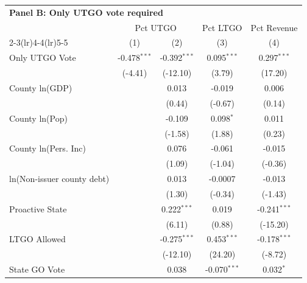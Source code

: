 \begingroup
\centering
\begin{tabular*}{\textwidth}{@{\extracolsep{\fill}}lcccc}
\multicolumn{5}{l}{\textbf{Panel B: Only UTGO vote required}}\\

\addlinespace
   \toprule
    & \multicolumn{2}{c}{Pct UTGO} & Pct LTGO & Pct Revenue\\
   \cmidrule(lr){2-3}\cmidrule(lr){4-4}\cmidrule(lr){5-5}
                              & (1)            & (2)            & (3)            & (4)\\  
   \midrule 
   Only UTGO Vote             & -0.478$^{***}$ & -0.392$^{***}$ & 0.095$^{***}$  & 0.297$^{***}$\\   
                              & (-4.41)        & (-12.10)        & (3.79)         & (17.20)\\   
   County ln(GDP)             &                & 0.013          & -0.019         & 0.006\\   
                              &                & (0.44)        & (-0.67)       & (0.14)\\   
   County ln(Pop)             &                & -0.109         & 0.098$^{*}$    & 0.011\\   
                              &                & (-1.58)        & (1.88)         & (0.23)\\   
   County ln(Pers. Inc)       &                & 0.076          & -0.061         & -0.015\\   
                              &                & (1.09)         & (-1.04)        & (-0.36)\\   
   ln(Non-issuer county debt) &                & 0.013          & -0.0007        & -0.013\\   
                              &                & (1.30)         & (-0.34)       & (-1.43)\\   
   Proactive State            &                & 0.222$^{***}$  & 0.019          & -0.241$^{***}$\\   
                              &                & (6.11)         & (0.88)        & (-15.20)\\   
   LTGO Allowed               &                & -0.275$^{***}$ & 0.453$^{***}$  & -0.178$^{***}$\\   
                              &                & (-12.10)        & (24.20)         & (-8.72)\\   
   State GO Vote              &                & 0.038          & -0.070$^{***}$ & 0.032$^{*}$\\   

\end{tabular*}
